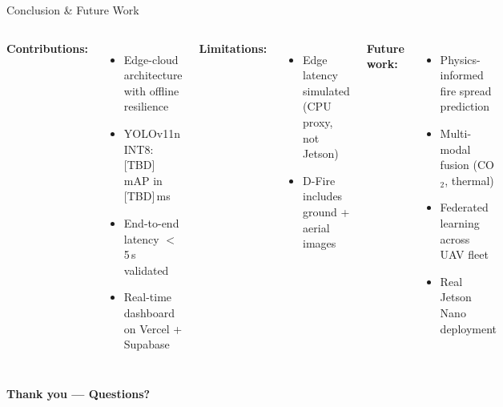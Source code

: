 \documentclass[aspectratio=169,10pt]{beamer}
\begin{document}
\begin{frame}{Conclusion \& Future Work}
  \begin{columns}
      \textbf{Contributions:}
      \begin{itemize}
        \item Edge-cloud architecture with offline resilience
        \item YOLOv11n INT8: [TBD] mAP in [TBD]\,ms
        \item End-to-end latency $<$ 5\,s validated
        \item Real-time dashboard on Vercel + Supabase
      \end{itemize}
      \vspace{0.5em}
      \textbf{Limitations:}
      \begin{itemize}
        \item Edge latency simulated (CPU proxy, not Jetson)
        \item D-Fire includes ground + aerial images
      \end{itemize}
      \textbf{Future work:}
      \begin{itemize}
        \item Physics-informed fire spread prediction
        \item Multi-modal fusion (CO$_2$, thermal)
        \item Federated learning across UAV fleet
        \item Real Jetson Nano deployment
      \end{itemize}
  \end{columns}
  \vspace{1em}
  \begin{center}
    \Large\textcolor{fireRed}{\textbf{Thank you — Questions?}}
  \end{center}
\end{frame}
\end{document}
